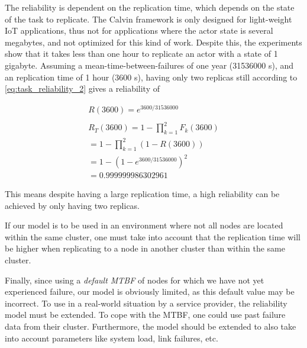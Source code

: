 \documentclass{cslthse-msc}
\begin{document}
The reliability is dependent on the replication time, which depends on the state of the task to replicate. The Calvin framework is only designed for light-weight IoT applications, thus not for applications where the actor state is several megabytes, and not optimized for this kind of work. Despite this, the experiments show that it takes less than one hour to replicate an actor with a state of 1 gigabyte. Assuming a mean-time-between-failures of one year (31536000 s), and an replication time of 1 hour (3600 s), having only two replicas still according to \cref{eq:task_reliability_2} gives a reliability of

\begin{equation*}
\begin{split}
R(3600) = e^{3600/31536000}\\
\\
R_{T}(3600) = 1 - \prod\limits_{k=1}^2 F_{k}(3600)\\
= 1 - \prod\limits_{k=1}^2 (1 - R(3600))\\
= 1 - (1 - e^{3600/31536000})^2\\
= 0.999999986302961
\end{split}
\end{equation*}

This means despite having a large replication time, a high reliability can be achieved by only having two replicas.

If our model is to be used in an environment where not all nodes are located within the same cluster, one must take into account that the replication time will be higher when replicating to a node in another cluster than within the same cluster.

Finally, since using a \emph{default MTBF} of nodes for which we have not yet experienced failure, our model is obviously limited, as this default value may be incorrect. To use in a real-world situation by a service provider, the reliability model must be extended. To cope with the MTBF, one could use past failure data from their cluster. Furthermore, the model should be extended to also take into account parameters like system load, link failures, etc. 


\end{document}
